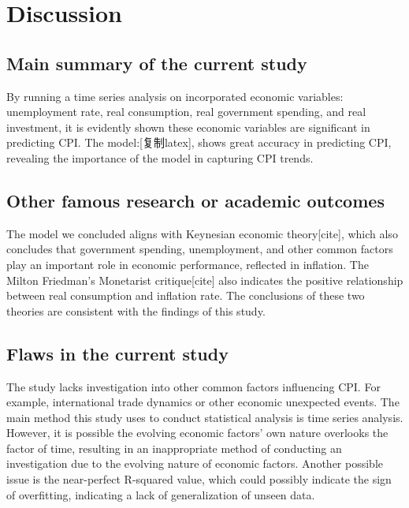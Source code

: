 \documentclass[
  man,floatsintext,
  man]{apa6}
\begin{document}
\hypertarget{discussion}{%
\section{Discussion}\label{discussion}}

\hypertarget{main-summary-of-the-current-study}{%
\subsection{Main summary of the current study}\label{main-summary-of-the-current-study}}

By running a time series analysis on incorporated economic variables: unemployment rate, real consumption, real government spending, and real investment, it is evidently shown these economic variables are significant in predicting CPI. The model:{[}复制latex{]}, shows great accuracy in predicting CPI, revealing the importance of the model in capturing CPI trends.

\hypertarget{other-famous-research-or-academic-outcomes}{%
\subsection{Other famous research or academic outcomes}\label{other-famous-research-or-academic-outcomes}}

The model we concluded aligns with Keynesian economic theory{[}cite{]}, which also concludes that government spending, unemployment, and other common factors play an important role in economic performance, reflected in inflation. The Milton Friedman's Monetarist critique{[}cite{]} also indicates the positive relationship between real consumption and inflation rate. The conclusions of these two theories are consistent with the findings of this study.

\hypertarget{flaws-in-the-current-study}{%
\subsection{Flaws in the current study}\label{flaws-in-the-current-study}}

The study lacks investigation into other common factors influencing CPI. For example, international trade dynamics or other economic unexpected events. The main method this study uses to conduct statistical analysis is time series analysis. However, it is possible the evolving economic factors' own nature overlooks the factor of time, resulting in an inappropriate method of conducting an investigation due to the evolving nature of economic factors. Another possible issue is the near-perfect R-squared value, which could possibly indicate the sign of overfitting, indicating a lack of generalization of unseen data.
\end{document}
